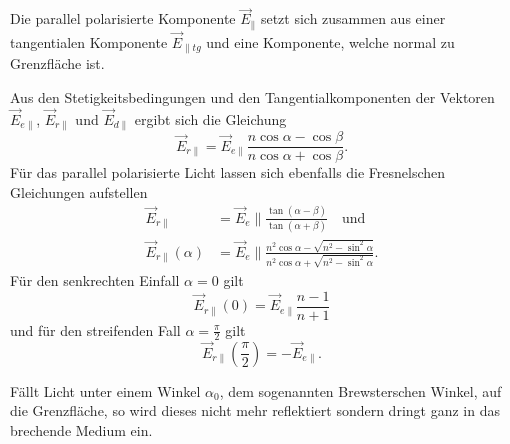 Die parallel polarisierte Komponente $\vec{E}_{\|}$ setzt sich zusammen aus einer tangentialen Komponente $\vec{E}_{\|tg}$
und eine Komponente, welche normal zu Grenzfläche ist.

Aus den Stetigkeitsbedingungen und den Tangentialkomponenten der Vektoren $\vec{E}_{e\|}$, $\vec{E}_{r\|}$ und $\vec{E}_{d\|}$
ergibt sich die Gleichung
\begin{equation}
    \vec{E}_{r\|} = \vec{E}_{e\|} \frac{n \cos \alpha - \cos \beta}{n \cos \alpha + \cos \beta}.
    \label{eqn:keinname}
\end{equation}
Für das parallel polarisierte Licht lassen sich ebenfalls die Fresnelschen Gleichungen aufstellen
\begin{equation}
    \begin{aligned}
    \vec{E}_{r \|}&=\vec{E}_e \| \frac{\tan (\alpha-\beta)}{\tan (\alpha+\beta)} \quad \text{und}\\
    \vec{E}_{r \|}(\alpha)&=\vec{E}_e \| \frac{n^2 \cos \alpha-\sqrt{n^2-\sin ^2 \alpha}}{n^2 \cos \alpha+\sqrt{n^2-\sin ^2 \alpha}} .
    \label{eqn:fresnel2}
    \end{aligned}
\end{equation}
Für den senkrechten Einfall $ \alpha = 0$ gilt
\begin{equation*}
    \vec{E}_{r\|}(0) = \vec{E}_{e\|} \frac{n - 1}{n + 1}
\end{equation*}
und für den streifenden Fall $\alpha= \frac{\pi}{2}$ gilt
\begin{equation*}
    \vec{E}_{r\|}(\frac{\pi}{2}) = -\vec{E}_{e\|}.
\end{equation*}

Fällt Licht unter einem Winkel $\alpha_0$, dem sogenannten Brewsterschen Winkel, auf die Grenzfläche, so wird dieses
nicht mehr reflektiert sondern dringt ganz in das brechende Medium ein.
